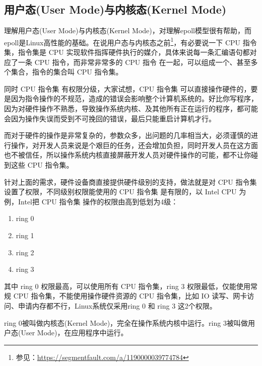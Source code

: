 \documentclass[../../../interview-questions.tex]{subfiles}
\begin{document}
\subsection{用户态(User Mode)与内核态(Kernel Mode)}

理解用户态(User Mode)与内核态(Kernel Mode)，对理解epoll模型很有帮助，而epoll是Linux高性能的基础。在说用户态与内核态之前\footnote{参见：\url{https://segmentfault.com/a/1190000039774784}}，有必要说一下 CPU 指令集，指令集是 CPU 实现软件指挥硬件执行的媒介，具体来说每一条汇编语句都对应了一条 CPU 指令，而非常非常多的 CPU 指令 在一起，可以组成一个、甚至多个集合，指令的集合叫 CPU 指令集。

同时 CPU 指令集 有权限分级，大家试想，CPU 指令集 可以直接操作硬件的，要是因为指令操作的不规范，造成的错误会影响整个计算机系统的。好比你写程序，因为对硬件操作不熟悉，导致操作系统内核、及其他所有正在运行的程序，都可能会因为操作失误而受到不可挽回的错误，最后只能重启计算机才行。

而对于硬件的操作是非常复杂的，参数众多，出问题的几率相当大，必须谨慎的进行操作，对开发人员来说是个艰巨的任务，还会增加负担，同时开发人员在这方面也不被信任，所以操作系统内核直接屏蔽开发人员对硬件操作的可能，都不让你碰到这些 CPU 指令集。


针对上面的需求，硬件设备商直接提供硬件级别的支持，做法就是对 CPU 指令集设置了权限，不同级别权限能使用的 CPU 指令集 是有限的，以 Intel CPU 为例，Intel把 CPU 指令集 操作的权限由高到低划为4级：

\begin{enumerate}
\item {ring 0}
\item {ring 1}
\item {ring 2}
\item {ring 3}
\end{enumerate}


其中 ring 0 权限最高，可以使用所有 CPU 指令集，ring 3 权限最低，仅能使用常规 CPU 指令集，不能使用操作硬件资源的 CPU 指令集，比如 IO 读写、网卡访问、申请内存都不行，Linux系统仅采用ring 0 和 ring 3 这2个权限。

ring 0被叫做内核态(Kernel Mode)，完全在操作系统内核中运行。ring 3被叫做用户态(User Mode)，在应用程序中运行。
\end{document}
